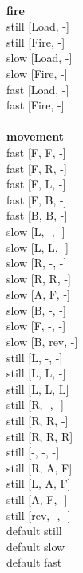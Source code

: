 \ \\ {\bf fire } \\
still [Load, -] \\
still [Fire, -] \\
slow [Load, -] \\
slow [Fire, -] \\
fast [Load, -] \\
fast [Fire, -] \\
\ \\ {\bf movement } \\
fast [F, F, -] \\
fast [F, R, -] \\
fast [F, L, -] \\
fast [F, B, -] \\
fast [B, B, -] \\
slow [L, -, -] \\
slow [L, L, -] \\
slow [R, -, -] \\
slow [R, R, -] \\
slow [A, F, -] \\
slow [B, -, -] \\
slow [F, -, -] \\
slow [B, rev, -] \\
still [L, -, -] \\
still [L, L, -] \\
still [L, L, L] \\
still [R, -, -] \\
still [R, R, -] \\
still [R, R, R] \\
still [-, -, -] \\
still [R, A, F] \\
still [L, A, F] \\
still [A, F, -] \\
still [rev, -, -] \\
default still \\
default slow \\
default fast \\


